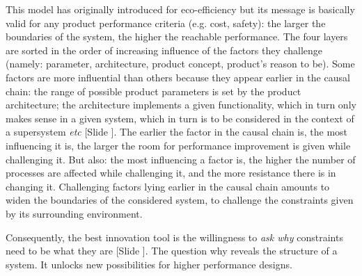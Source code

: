 \documentclass{article}
\newcounter{slide}
\begin{document}
This model has originally introduced for eco-efficiency \cite{brezet1997dynamics} but its message is basically valid for any product performance criteria (e.g. cost, safety): the larger the boundaries of the system, the higher the reachable performance. The four layers are sorted in the order of increasing influence of the factors they challenge (namely: parameter, architecture, product concept, product's reason to be). Some factors are more influential than others because they appear earlier in the causal chain: the range of possible product parameters is set by the product architecture; the architecture implements a given functionality, which in turn only makes sense in a given system, which in turn is to be considered in the context of a supersystem \emph{etc} {\color{blue}[Slide ]}. The earlier the factor in the causal chain is, the most influencing it is, the larger the room for performance improvement is given while challenging it. But also: the most influencing a factor is, the higher the number of processes are affected while challenging it, and the more resistance there is in changing it. Challenging factors lying earlier in the causal chain amounts to widen the boundaries of the considered system, to challenge the constraints given by its surrounding environment. 

Consequently, the best innovation tool is the willingness to \emph{ask why} constraints need to be what they are {\color{blue}[Slide ]}. The question why reveals the structure of a system. It unlocks new possibilities for higher performance designs.
\end{document}

